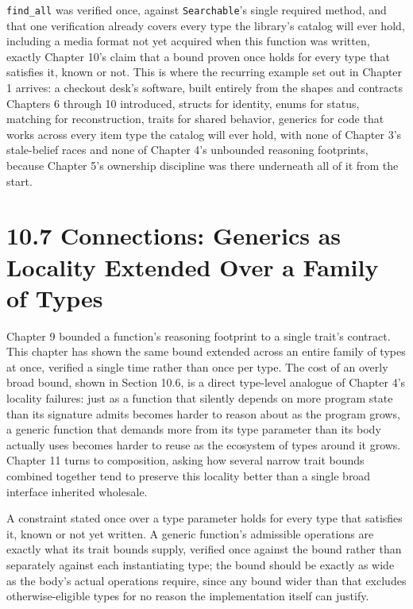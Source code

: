 \documentclass[11pt]{book}
\begin{document}
\texttt{find\_all} was verified once, against \texttt{Searchable}'s single required method, and that one verification already covers every type the library's catalog will ever hold, including a media format not yet acquired when this function was written, exactly Chapter 10's claim that a bound proven once holds for every type that satisfies it, known or not. This is where the recurring example set out in Chapter 1 arrives: a checkout desk's software, built entirely from the shapes and contracts Chapters 6 through 10 introduced, structs for identity, enums for status, matching for reconstruction, traits for shared behavior, generics for code that works across every item type the catalog will ever hold, with none of Chapter 3's stale-belief races and none of Chapter 4's unbounded reasoning footprints, because Chapter 5's ownership discipline was there underneath all of it from the start.

\section*{10.7 Connections: Generics as Locality Extended Over a Family of Types}

Chapter 9 bounded a function's reasoning footprint to a single trait's contract. This chapter has shown the same bound extended across an entire family of types at once, verified a single time rather than once per type. The cost of an overly broad bound, shown in Section 10.6, is a direct type-level analogue of Chapter 4's locality failures: just as a function that silently depends on more program state than its signature admits becomes harder to reason about as the program grows, a generic function that demands more from its type parameter than its body actually uses becomes harder to reuse as the ecosystem of types around it grows. Chapter 11 turns to composition, asking how several narrow trait bounds combined together tend to preserve this locality better than a single broad interface inherited wholesale.

\begin{invariantbox}
A constraint stated once over a type parameter holds for every type that satisfies it, known or not yet written. A generic function's admissible operations are exactly what its trait bounds supply, verified once against the bound rather than separately against each instantiating type; the bound should be exactly as wide as the body's actual operations require, since any bound wider than that excludes otherwise-eligible types for no reason the implementation itself can justify.
\end{invariantbox}
\end{document}
